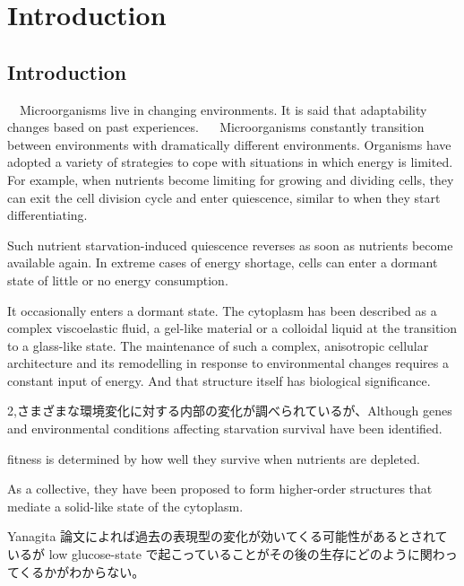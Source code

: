 \chapter{Introduction}
\section{Introduction}
　Microorganisms live in changing environments. It is said that adaptability changes based on past experiences.
　
 Microorganisms constantly transition between environments with dramatically different environments.
 Organisms have adopted a variety of strategies to cope with situations in which energy is limited. For example, when nutrients become limiting for growing and dividing cells, they can exit the cell division cycle and enter quiescence, similar to when they start differentiating. 
 
 Such nutrient starvation-induced quiescence reverses as soon as nutrients become available again. In extreme cases of energy shortage, cells can enter a dormant state of little or no energy consumption.
  
 It occasionally enters a dormant state. The cytoplasm has been described as a complex viscoelastic fluid, a gel-like material or a colloidal liquid at the transition to a glass-like state. The maintenance of such a complex, anisotropic cellular architecture and its remodelling in response to environmental changes requires a constant input of energy.  And that structure itself has biological significance.

2,さまざまな環境変化に対する内部の変化が調べられているが、Although genes and environmental conditions affecting starvation survival have been identified.

fitness is determined by how well they survive when nutrients are depleted.

As a collective, they have been proposed to form higher-order structures that mediate a solid-like state of the cytoplasm.

Yanagita 論文によれば過去の表現型の変化が効いてくる可能性があるとされているが
low glucose-state で起こっていることがその後の生存にどのように関わってくるかがわからない。

